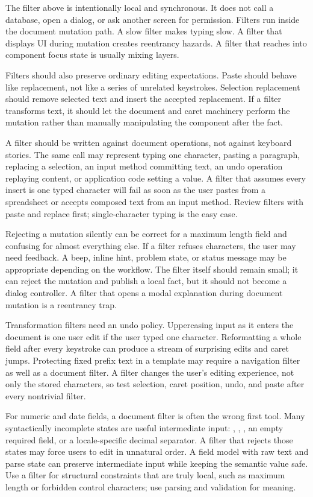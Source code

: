 The filter above is intentionally local and synchronous. It does not call a database, open a dialog, or ask another screen for permission. Filters run inside the document mutation path. A slow filter makes typing slow. A filter that displays UI during mutation creates reentrancy hazards. A filter that reaches into component focus state is usually mixing layers.

Filters should also preserve ordinary editing expectations. Paste should behave like replacement, not like a series of unrelated keystrokes. Selection replacement should remove selected text and insert the accepted replacement. If a filter transforms text, it should let the document and caret machinery perform the mutation rather than manually manipulating the component after the fact.

A filter should be written against document operations, not against keyboard
stories. The same  call may represent typing one character,
pasting a paragraph, replacing a selection, an input method committing text, an
undo operation replaying content, or application code setting a value. A filter
that assumes every insert is one typed character will fail as soon as the user
pastes from a spreadsheet or accepts composed text from an input method. Review
filters with paste and replace first; single-character typing is the easy case.

Rejecting a mutation silently can be correct for a maximum length field and
confusing for almost everything else. If a filter refuses characters, the user
may need feedback. A beep, inline hint, problem state, or status message may be
appropriate depending on the workflow. The filter itself should remain small;
it can reject the mutation and publish a local fact, but it should not become a
dialog controller. A filter that opens a modal explanation during document
mutation is a reentrancy trap.

Transformation filters need an undo policy. Uppercasing input as it enters the
document is one user edit if the user typed one character. Reformatting a whole
field after every keystroke can produce a stream of surprising edits and caret
jumps. Protecting fixed prefix text in a template may require a navigation
filter as well as a document filter. A filter changes the user's editing
experience, not only the stored characters, so test selection, caret position,
undo, and paste after every nontrivial filter.

For numeric and date fields, a document filter is often the wrong first tool.
Many syntactically incomplete states are useful intermediate input:
\api{-}, , , an empty required field, or a locale-specific
decimal separator. A filter that rejects those states may force users to edit
in unnatural order. A field model with raw text and parse state can preserve
intermediate input while keeping the semantic value safe. Use a filter for
structural constraints that are truly local, such as maximum length or
forbidden control characters; use parsing and validation for meaning.

